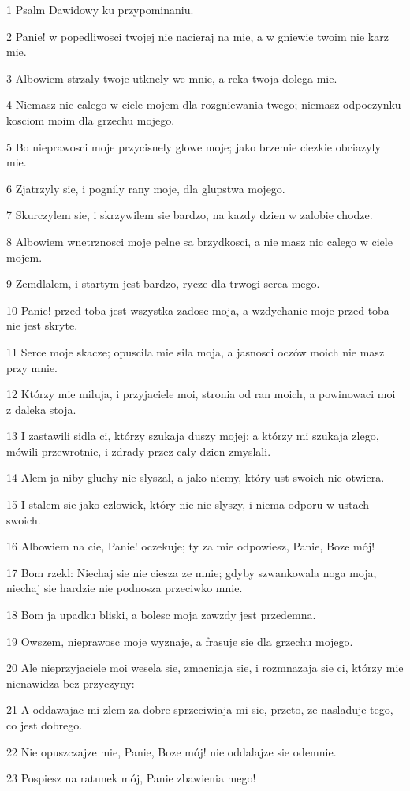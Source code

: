 \par 1 Psalm Dawidowy ku przypominaniu.
\par 2 Panie! w popedliwosci twojej nie nacieraj na mie, a w gniewie twoim nie karz mie.
\par 3 Albowiem strzaly twoje utknely we mnie, a reka twoja dolega mie.
\par 4 Niemasz nic calego w ciele mojem dla rozgniewania twego; niemasz odpoczynku kosciom moim dla grzechu mojego.
\par 5 Bo nieprawosci moje przycisnely glowe moje; jako brzemie ciezkie obciazyly mie.
\par 6 Zjatrzyly sie, i pognily rany moje, dla glupstwa mojego.
\par 7 Skurczylem sie, i skrzywilem sie bardzo, na kazdy dzien w zalobie chodze.
\par 8 Albowiem wnetrznosci moje pelne sa brzydkosci, a nie masz nic calego w ciele mojem.
\par 9 Zemdlalem, i startym jest bardzo, rycze dla trwogi serca mego.
\par 10 Panie! przed toba jest wszystka zadosc moja, a wzdychanie moje przed toba nie jest skryte.
\par 11 Serce moje skacze; opuscila mie sila moja, a jasnosci oczów moich nie masz przy mnie.
\par 12 Którzy mie miluja, i przyjaciele moi, stronia od ran moich, a powinowaci moi z daleka stoja.
\par 13 I zastawili sidla ci, którzy szukaja duszy mojej; a którzy mi szukaja zlego, mówili przewrotnie, i zdrady przez caly dzien zmyslali.
\par 14 Alem ja niby gluchy nie slyszal, a jako niemy, który ust swoich nie otwiera.
\par 15 I stalem sie jako czlowiek, który nic nie slyszy, i niema odporu w ustach swoich.
\par 16 Albowiem na cie, Panie! oczekuje; ty za mie odpowiesz, Panie, Boze mój!
\par 17 Bom rzekl: Niechaj sie nie ciesza ze mnie; gdyby szwankowala noga moja, niechaj sie hardzie nie podnosza przeciwko mnie.
\par 18 Bom ja upadku bliski, a bolesc moja zawzdy jest przedemna.
\par 19 Owszem, nieprawosc moje wyznaje, a frasuje sie dla grzechu mojego.
\par 20 Ale nieprzyjaciele moi wesela sie, zmacniaja sie, i rozmnazaja sie ci, którzy mie nienawidza bez przyczyny:
\par 21 A oddawajac mi zlem za dobre sprzeciwiaja mi sie, przeto, ze nasladuje tego, co jest dobrego.
\par 22 Nie opuszczajze mie, Panie, Boze mój! nie oddalajze sie odemnie.
\par 23 Pospiesz na ratunek mój, Panie zbawienia mego!

